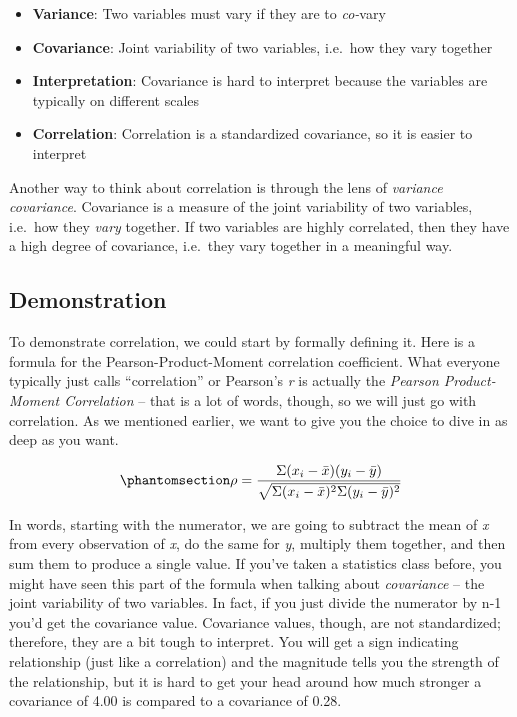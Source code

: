\documentclass[
  letterpaper,
]{krantz}
\providecommand{\tightlist}{%
  \setlength{\itemsep}{0pt}\setlength{\parskip}{0pt}}\usepackage{longtable,booktabs,array}
\begin{document}
\begin{itemize}
\tightlist
\item
  \textbf{Variance}: Two variables must vary if they are to
  \emph{co-}vary
\item
  \textbf{Covariance}: Joint variability of two variables, i.e.~how they
  vary together
\item
  \textbf{Interpretation}: Covariance is hard to interpret because the
  variables are typically on different scales
\item
  \textbf{Correlation}: Correlation is a standardized covariance, so it
  is easier to interpret
\end{itemize}

Another way to think about correlation is through the lens of
\emph{variance} \emph{covariance}. Covariance is a measure of the joint
variability of two variables, i.e.~how they \emph{vary} together. If two
variables are highly correlated, then they have a high degree of
covariance, i.e.~they vary together in a meaningful way.

\subsection*{Demonstration}\label{demonstration}

To demonstrate correlation, we could start by formally defining it. Here
is a formula for the Pearson-Product-Moment correlation coefficient.
What everyone typically just calls ``correlation'' or Pearson's \emph{r}
is actually the \emph{Pearson Product-Moment Correlation} -- that is a
lot of words, though, so we will just go with correlation. As we
mentioned earlier, we want to give you the choice to dive in as deep as
you want.

\begin{equation}\phantomsection\label{eq-pearson}{
\rho = \frac{\Sigma(x_i-\bar{x})(y_i-\bar{y})}{\sqrt{\Sigma(x_i-\bar{x})^2\Sigma(y_i-\bar{y})^2}}
}\end{equation}

In words, starting with the numerator, we are going to subtract the mean
of \emph{x} from every observation of \emph{x}, do the same for
\emph{y}, multiply them together, and then sum them to produce a single
value. If you've taken a statistics class before, you might have seen
this part of the formula when talking about \emph{covariance} -- the
joint variability of two variables. In fact, if you just divide the
numerator by n-1 you'd get the covariance value. Covariance values,
though, are not standardized; therefore, they are a bit tough to
interpret. You will get a sign indicating relationship (just like a
correlation) and the magnitude tells you the strength of the
relationship, but it is hard to get your head around how much stronger a
covariance of 4.00 is compared to a covariance of 0.28.
\end{document}

